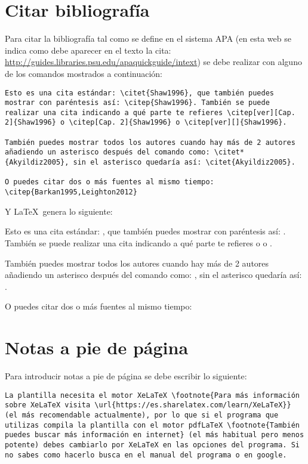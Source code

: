 \section{Citar bibliografía}
Para citar la bibliografía tal como se define en el sistema APA (en esta web se indica como debe aparecer en el texto la cita: \url{http://guides.libraries.psu.edu/apaquickguide/intext}) se debe realizar con alguno de los comandos mostrados a continuación:

\begin{lstlisting}[style=Latex-color]
Esto es una cita estándar: \citet{Shaw1996}, que también puedes mostrar con paréntesis así: \citep{Shaw1996}. También se puede realizar una cita indicando a qué parte te refieres \citep[ver][Cap. 2]{Shaw1996} o \citep[Cap. 2]{Shaw1996} o \citep[ver][]{Shaw1996}. 

También puedes mostrar todos los autores cuando hay más de 2 autores añadiendo un asterisco después del comando como: \citet*{Akyildiz2005}, sin el asterisco quedaría así: \citet{Akyildiz2005}.

O puedes citar dos o más fuentes al mismo tiempo: \citep{Barkan1995,Leighton2012}

\end{lstlisting}
Y \LaTeX~genera lo siguiente:
\\
\par Esto es una cita estándar: \citet{Shaw1996}, que también puedes mostrar con paréntesis así: \citep{Shaw1996}. También se puede realizar una cita indicando a qué parte te refieres \citep[ver][Cap. 2]{Shaw1996} o \citep[Cap. 2]{Shaw1996} o \citep[ver][]{Shaw1996}. 
\\
\par También puedes mostrar todos los autores cuando hay más de 2 autores añadiendo un asterisco después del comando como: \citet*{Akyildiz2005}, sin el asterisco quedaría así: \citet{Akyildiz2005}.
\\
\par O puedes citar dos o más fuentes al mismo tiempo: \citep{Barkan1995,Leighton2012}


\section{Notas a pie de página}

Para introducir notas a pie de página se debe escribir lo siguiente:

\begin{lstlisting}[style=Latex-color]
	La plantilla necesita el motor XeLaTeX \footnote{Para más información sobre XeLaTeX visita \url{https://es.sharelatex.com/learn/XeLaTeX}} (el más recomendable actualmente), por lo que si el programa que utilizas compila la plantilla con el motor pdfLaTeX \footnote{También puedes buscar más información en internet} (el más habitual pero menos potente) debes cambiarlo por XeLaTeX en las opciones del programa. Si no sabes como hacerlo busca en el manual del programa o en google.
\end{lstlisting}

